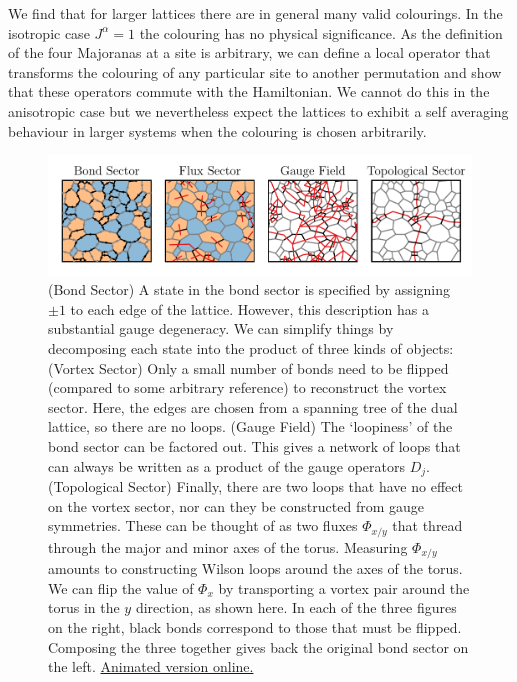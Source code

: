 We find that for larger lattices there are in general many valid colourings. In the isotropic case \(J^\alpha = 1\) the colouring has no physical significance. As the definition of the four Majoranas at a site is arbitrary, we can define a local operator that transforms the colouring of any particular site to another permutation and show that these operators commute with the Hamiltonian. We cannot do this in the anisotropic case but we nevertheless expect the lattices to exhibit a self averaging behaviour in larger systems when the colouring is chosen arbitrarily.

\hypertarget{fig:state_decomposition_animated}{%
\begin{figure}
\centering
\includegraphics[width=1\textwidth,height=\textheight]{figure_code/amk_chapter/intro/state_decomposition_animated/state_decomposition_animated}
\caption[{State Decomposition}]{(Bond Sector) A state in the bond sector is specified by assigning \(\pm 1\) to each edge of the lattice. However, this description has a substantial gauge degeneracy. We can simplify things by decomposing each state into the product of three kinds of objects: (Vortex Sector) Only a small number of bonds need to be flipped (compared to some arbitrary reference) to reconstruct the vortex sector. Here, the edges are chosen from a spanning tree of the dual lattice, so there are no loops. (Gauge Field) The `loopiness' of the bond sector can be factored out. This gives a network of loops that can always be written as a product of the gauge operators \(D_j\). (Topological Sector) Finally, there are two loops that have no effect on the vortex sector, nor can they be constructed from gauge symmetries. These can be thought of as two fluxes \(\Phi_{x/y}\) that thread through the major and minor axes of the torus. Measuring \(\Phi_{x/y}\) amounts to constructing Wilson loops around the axes of the torus. We can flip the value of \(\Phi_{x}\) by transporting a vortex pair around the torus in the \(y\) direction, as shown here. In each of the three figures on the right, black bonds correspond to those that must be flipped. Composing the three together gives back the original bond sector on the left. \href{http://thomashodson.com/assets/thesis/figure_code/amk_chapter/intro/state_decomposition_animated/state_decomposition_animated.gif}{ Animated version online.}}
\label{fig:state_decomposition_animated}
\end{figure}
}

